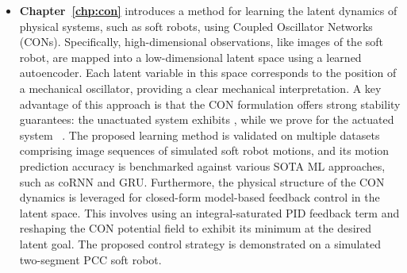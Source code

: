 \begin{itemize}
    \item \textbf{Chapter~\ref{chp:con}} introduces a method for learning the latent dynamics of physical systems, such as soft robots, using Coupled Oscillator Networks (CONs). Specifically, high-dimensional observations, like images of the soft robot, are mapped into a low-dimensional latent space using a learned autoencoder. Each latent variable in this space corresponds to the position of a mechanical oscillator, providing a clear mechanical interpretation. A key advantage of this approach is that the \gls{CON} formulation offers strong stability guarantees: the unactuated system exhibits , while we prove for the actuated system ~\citep{khalil2002nonlinear}. The proposed learning method is validated on multiple datasets comprising image sequences of simulated soft robot motions, and its motion prediction accuracy is benchmarked against various \gls{SOTA} \gls{ML} approaches, such as \gls{coRNN} and \gls{GRU}. Furthermore, the physical structure of the \gls{CON} dynamics is leveraged for closed-form model-based feedback control in the latent space. This involves using an integral-saturated PID feedback term and reshaping the \gls{CON} potential field to exhibit its minimum at the desired latent goal. The proposed control strategy is demonstrated on a simulated two-segment \gls{PCC} soft robot.

\end{itemize}
